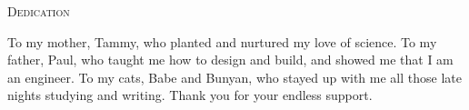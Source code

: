 \vspace*{\fill}
\begin{center}
{\LARGE\textsc{Dedication}}\vspace{0.5cm}

To my mother, Tammy, who planted and nurtured my love of science. To my father, Paul, who taught me how to design and build, and showed me that I am an engineer. To my cats, Babe and Bunyan, who stayed up with me all those late nights studying and writing. Thank you for your endless support.

\end{center}
\vspace{\fill}
